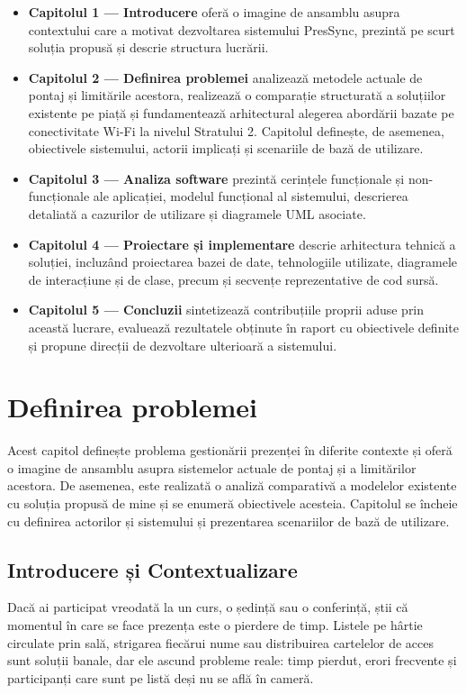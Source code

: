 \documentclass[11pt]{article}
\begin{document}
\begin{itemize}
    \item \textbf{Capitolul 1 — Introducere} oferă o imagine de ansamblu asupra contextului care a motivat dezvoltarea sistemului PresSync, prezintă pe scurt soluția propusă și descrie structura lucrării.
    \item \textbf{Capitolul 2 — Definirea problemei} analizează metodele actuale de pontaj și limitările acestora, realizează o comparație structurată a soluțiilor existente pe piață și fundamentează arhitectural alegerea abordării bazate pe conectivitate Wi-Fi la nivelul Stratului 2. Capitolul definește, de asemenea, obiectivele sistemului, actorii implicați și scenariile de bază de utilizare.
    \item \textbf{Capitolul 3 — Analiza software} prezintă cerințele funcționale și non-funcționale ale aplicației, modelul funcțional al sistemului, descrierea detaliată a cazurilor de utilizare și diagramele UML asociate.
    \item \textbf{Capitolul 4 — Proiectare și implementare} descrie arhitectura tehnică a soluției, incluzând proiectarea bazei de date, tehnologiile utilizate, diagramele de interacțiune și de clase, precum și secvențe reprezentative de cod sursă.
    \item \textbf{Capitolul 5 — Concluzii} sintetizează contribuțiile proprii aduse prin această lucrare, evaluează rezultatele obținute în raport cu obiectivele definite și propune direcții de dezvoltare ulterioară a sistemului.
\end{itemize}
\newpage
\section{Definirea problemei}
    Acest capitol definește problema gestionării prezenței în diferite contexte și oferă o imagine de ansamblu asupra sistemelor actuale de pontaj și a limitărilor acestora. De asemenea, este realizată o analiză comparativă a modelelor existente cu soluția propusă de mine și se enumeră obiectivele acesteia. Capitolul se încheie cu definirea actorilor și sistemului și prezentarea scenariilor de bază de utilizare. 
\subsection{Introducere și Contextualizare}
Dacă ai participat vreodată la un curs, o ședință sau o conferință, știi că momentul în care se face prezența este o pierdere de timp. Listele pe hârtie circulate prin sală, strigarea fiecărui nume sau distribuirea cartelelor de acces sunt soluții banale, dar ele ascund probleme reale: timp pierdut, erori frecvente și participanți care sunt pe listă deși nu se află în cameră.
\end{document}
